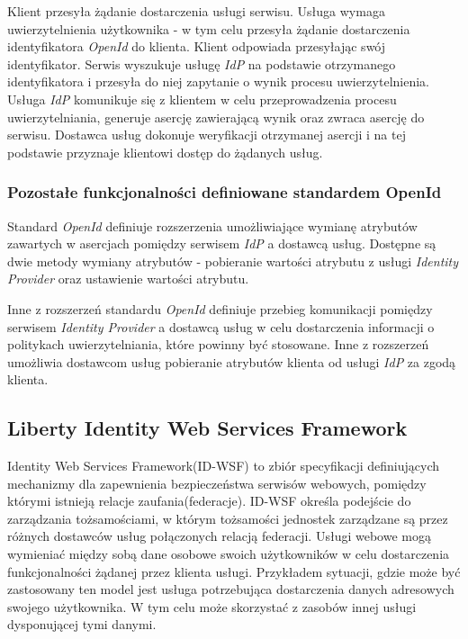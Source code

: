 		Klient przesyła żądanie dostarczenia usługi serwisu. Usługa wymaga uwierzytelnienia użytkownika - w tym celu przesyła żądanie dostarczenia identyfikatora \textit{OpenId} do klienta. Klient odpowiada przesyłając swój identyfikator. Serwis wyszukuje usługę \textit{IdP} na podstawie otrzymanego identyfikatora i przesyła do niej zapytanie o wynik procesu uwierzytelnienia. Usługa \textit{IdP} komunikuje się z klientem w celu przeprowadzenia procesu uwierzytelniania, generuje asercję zawierającą wynik oraz zwraca asercję do serwisu. Dostawca usług dokonuje weryfikacji otrzymanej asercji i na tej podstawie przyznaje klientowi dostęp do żądanych usług.

	\subsubsection{Pozostałe funkcjonalności definiowane standardem OpenId}

		Standard \textit{OpenId} definiuje rozszerzenia umożliwiające wymianę atrybutów zawartych w asercjach pomiędzy serwisem \textit{IdP} a dostawcą usług. Dostępne są dwie metody wymiany atrybutów - pobieranie wartości atrybutu z usługi \textit{Identity Provider} oraz ustawienie wartości atrybutu.

		Inne z rozszerzeń standardu \textit{OpenId} definiuje przebieg komunikacji pomiędzy serwisem \textit{Identity Provider} a dostawcą usług w celu dostarczenia informacji o politykach uwierzytelniania, które powinny być stosowane. Inne z rozszerzeń umożliwia dostawcom usług pobieranie atrybutów klienta od usługi \textit{IdP} za zgodą klienta.

\subsection{Liberty Identity Web Services Framework}

	Identity Web Services Framework(ID-WSF) to zbiór specyfikacji definiujących mechanizmy dla zapewnienia bezpieczeństwa serwisów webowych, pomiędzy którymi istnieją relacje zaufania(federacje)\cite{Oracle10}. ID-WSF określa podejście do zarządzania tożsamościami, w którym tożsamości jednostek zarządzane są przez różnych dostawców usług połączonych relacją federacji. Usługi webowe mogą wymieniać między sobą dane osobowe swoich użytkowników w celu dostarczenia funkcjonalności żądanej przez klienta usługi. Przykładem sytuacji, gdzie może być zastosowany ten model jest usługa potrzebująca dostarczenia danych adresowych swojego użytkownika. W tym celu może skorzystać z zasobów innej usługi dysponującej tymi danymi.

